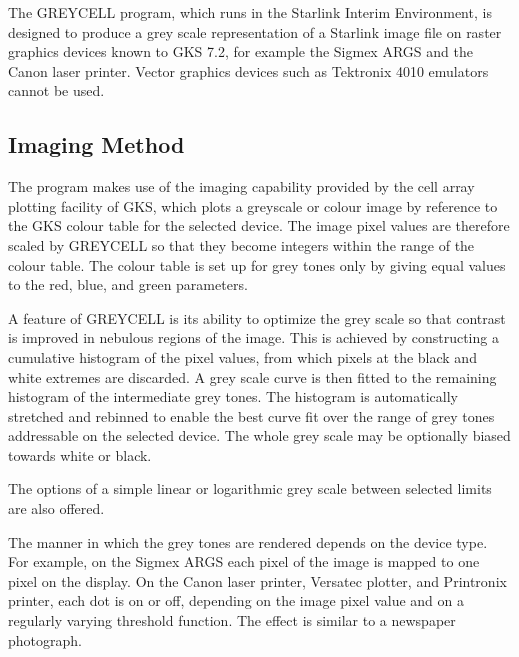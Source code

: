 The GREYCELL program, which runs in the Starlink Interim Environment, is
designed to produce a grey scale representation of a Starlink image file on
raster graphics devices known to GKS 7.2, for example the Sigmex ARGS and the
Canon laser printer.
Vector graphics devices such as Tektronix 4010 emulators cannot be used.

\subsection{Imaging Method}

The program makes use of the imaging capability provided by the cell array
plotting facility of GKS, which plots a greyscale or colour image by
reference to the GKS colour table for the selected device.
The image pixel values are therefore scaled by GREYCELL so that they become
integers within the  range of the colour table.
The colour table is set up for grey tones only by giving equal values to the
red, blue, and green parameters.

A feature of GREYCELL is its ability to optimize the grey scale so that contrast
is improved in nebulous regions of the image.
This is achieved by constructing a cumulative histogram of the pixel values,
from which pixels at the black and white extremes are discarded.
A grey scale curve is then fitted to the remaining histogram of the intermediate
grey tones.
The histogram is automatically stretched and rebinned to enable the best curve
fit over the range of grey tones addressable on the selected device.
The whole grey scale may be optionally biased towards white or black.

The options of a simple linear or logarithmic grey scale between selected
limits are also offered.

The manner in which the grey tones are rendered depends on the device
type.
For example, on the Sigmex ARGS each pixel of the image is mapped to one pixel
on the display.
On the Canon laser printer, Versatec plotter, and Printronix printer, each dot
is on or off, depending on the image pixel value and on a regularly varying
threshold function.
The effect is similar to a newspaper photograph.

